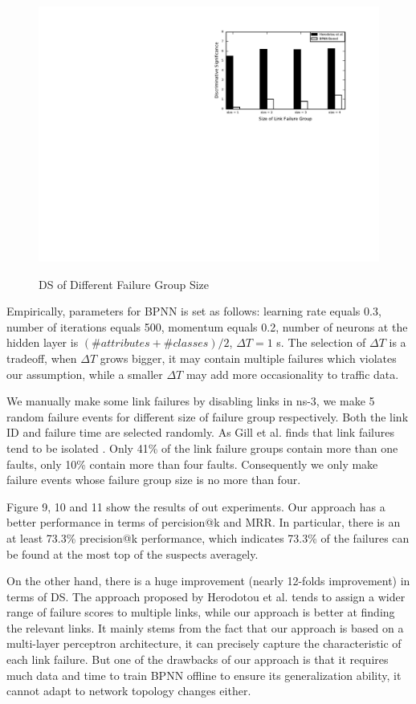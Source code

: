 \documentclass{sig-alternate-05-2015}
\begin{document}
\begin{figure}[t]
  \centering
  \includegraphics[scale=0.7]{ds} \\
  \caption{DS of Different Failure Group Size}
\end{figure}
Empirically, parameters for BPNN is set as follows: learning rate equals 0.3, number of iterations equals 500, momentum equals 0.2, number of neurons at the hidden layer is $(\# attributes + \# classes) / 2$, $\Delta T = 1 $ s. The selection of $\Delta T$ is a tradeoff, when $\Delta T$ grows bigger, it may contain multiple failures which violates our assumption, while a smaller $\Delta T$ may add more occasionality to traffic data. 

We manually make some link failures by disabling links in ns-3, we make 5 random failure events for different size of failure group respectively. Both the link ID and failure time are selected randomly. As Gill et al. finds that link failures tend to be isolated \cite{gill2011understanding}. Only 41\% of the link failure groups contain more than one faults, only 10\% contain more than four faults. Consequently we only make failure events whose failure group size is no more than four.

Figure 9, 10 and 11 show the results of out experiments. Our approach has a better performance in terms of percision@k and MRR. In particular, there is an at least 73.3\% precision@k performance, which indicates 73.3\% of the failures can be found at the most top of the suspects averagely.

On the other hand, there is a huge improvement (nearly 12-folds improvement) in terms of DS. The approach proposed by Herodotou et al. tends to assign a wider range of failure scores to multiple links, while our approach is better at finding the relevant links. It mainly stems from the fact that our approach is based on a multi-layer perceptron architecture, it can precisely capture the characteristic of each link failure. But one of the drawbacks of our approach is that it requires much data and time to train BPNN offline to ensure its generalization ability, it cannot adapt to network topology changes either.
\end{document}
